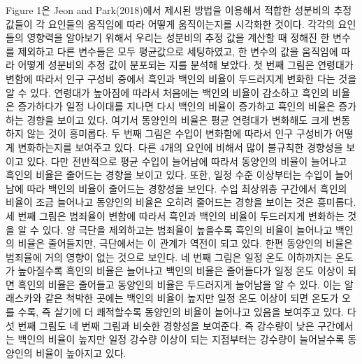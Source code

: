 Figure 1은 Jeon and Park(2018)에서 제시된 방법을 이용해서 적합한 성분비의 추정 값들이 각 요인들의 움직임에 따라 어떻게 움직이는지를 시각화한 것이다. 각각의 요인들의 영향력을 알아보기 위해서 우리는 성분비의 추정 값을 계산할 때 정해진 한 변수를 제외하고 다른 변수들은 모두 평균값으로 세팅하였고, 한 변수의 값을 움직임에 따라 어떻게 성분비의 추정 값이 분포되는 지를 분석해 보았다. 첫 번째 그림은 연령대가 변함에 따라서 인구 구성비 중에서 흑인과 백인의 비율이 두드러지게 변화한 다는 것을 알 수 있다. 연령대가 높아짐에 따라서 처음에는 백인의 비율이 감소하고 흑인의 비율은 증가하다가 일정 나이대를 지나면 다시 백인의 비율이 증가하고 흑인의 비율은 증가하는 경향을 보이고 있다. 여기서 동양인의 비율은 평균 연령대가 변화해도 크게 변동하지 않는 것이 흥미롭다. 두 번째 그림은 수입이 변화함에 따라서 인구 구성비가 어떻게 변화하는지를 보여주고 있다. 다른 4개의 요인에 비해서 많이 불규칙한 경향성을 보이고 있다. 다만 전반적으로 평균 수입이 늘어남에 따라서 동양인의 비율이 늘어나고 흑인의 비율은 줄어드는 경향을 보이고 있다. 또한, 일정 수준 이상부터는 수입이 늘어남에 따라 백인의 비율이 줄어드는 경향성을 보인다. 수입 최상위층 구간에서 흑인의 비율이 조금 늘어나고 동양인의 비율은 오히려 줄어드는 경향을 보이는 것은 흥미롭다. 세 번째 그림은 범죄율이 변함에 따라서 흑인과 백인의 비율이 두드러지게 변화하는 것을 알 수 있다. 양 극단을 제외하고는 범죄율이 높을수록 흑인의 비율이 늘어나고 백인의 비율은 줄어들지만, 극단에서는 이 관계가 역전이 되고 있다. 한편 동양인의 비율은 범죄율에 거의 영향이 없는 것으로 보인다. 네 번째 그림은 일정 온도 이하까지는 온도가 높아질수록 흑인의 비율은 늘어나고 백인의 비율은 줄어들다가 일정 온도 이상이 되면 흑인의 비율은 줄어들고 동양인의 비율은 두드러지게 늘어남을 알 수 있다. 이는 알래스카와 같은 척박한 곳에는 백인의 비율이 높지만 일정 온도 이상이 되면 온도가 오를 수록, 즉 살기에 더 쾌적할수록 동양인의 비율이 늘어나고 있음을 보여주고 있다. 다섯 번째 그림도 네 번째 그림과 비슷한 경향성을 보여준다. 즉 강수량이 낮은 구간에서는 백인의 비율이 높지만 일정 강수량 이상이 되는 지점부터는 강수량이 늘어날수록 동양인의 비율이 높아지고 있다.



